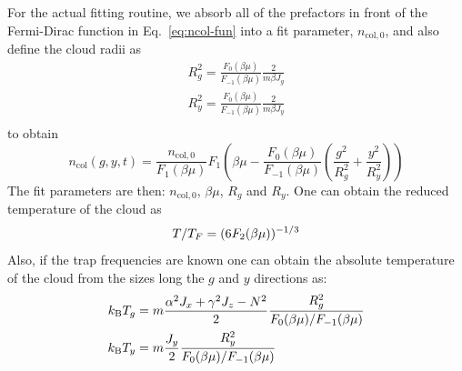 For the actual fitting routine, we absorb all of the prefactors in front of the
Fermi-Dirac function in Eq.~\ref{eq:ncol-fun} into a fit parameter,
$n_{\mathrm{col},0}$, and also define the cloud radii as 
\begin{align}
 R_{g}^{2} = \frac{F_{0}(\beta\mu)}{F_{-1}(\beta\mu)} 
    \frac{2} {m\beta J_{g}} \\
 R_{y}^{2} = \frac{F_{0}(\beta\mu)}{F_{-1}(\beta\mu)} 
    \frac{2} {m\beta J_{y}} \\
\end{align}
to obtain 
\begin{equation}
n_{\mathrm{col}}(g,y,t) =   
   \frac{n_{\mathrm{col},0}}{ F_{1}(\beta\mu)}   
   F_{1} \left( \beta\mu  -  \frac{F_{0}(\beta\mu)}{F_{-1}(\beta\mu)} 
     \left( \frac{g^{2}}{R_{g}^{2}} + \frac{y^{2}}{R_{y}^{2}} \right)
\right)
\label{eq:ncol}
\end{equation}
The fit parameters are then: $n_{\mathrm{col},0}$, $\beta\mu$, $R_{g}$ and
$R_{y}$.  One can obtain the reduced temperature of the cloud as 
\begin{equation}
T/ T_{F}  = (6 F_{2}(\beta\mu) )^{-1/3} 
\label{eq:ncolTTF}
\end{equation} 
Also, if the trap frequencies are known one can obtain the absolute temperature
of the cloud from the sizes long the $g$ and $y$ directions as:
\begin{align}
k_{\mathrm{B}} T_{g} &= 
   m\frac{ \alpha^{2} J_{x} + 
    \gamma^{2} J_{z}- N^{2}}{2} \frac{R_{g}^{2}}{F_{0}(\beta\mu)/F_{-1}(\beta\mu)}
\label{eq:ncolT1} 
 \\
k_{\mathrm{B}} T_{y} &= 
   m\frac{J_{y}}{2} \frac{R_{y}^{2}}{F_{0}(\beta\mu)/F_{-1}(\beta\mu)}
\label{eq:ncolT2} 
\end{align}

